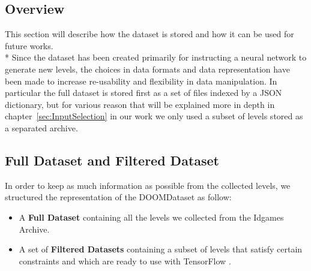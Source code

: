 \subsection{Overview}
This section will describe how the dataset is stored and how it can be used for future works. \\* 
Since the dataset has been created primarily for instructing a neural network to generate new levels, the choices in data formats and data representation have been made to increase re-usability and flexibility in data manipulation. In particular the full dataset is stored first as a set of files indexed by a JSON dictionary, but for various reason that will be explained more in depth in  chapter~\ref{sec:InputSelection} in our work we only used a subset of levels stored as a separated archive.
\subsection{Full Dataset and Filtered Dataset}
In order to keep as much information as possible from the collected levels, we structured the representation of the DOOMDataset as follow:
\begin{itemize}
	\item  A \textbf{Full Dataset} containing all the levels we collected from the Idgames Archive.
	\item A set of \textbf{Filtered Datasets} containing a subset of levels that satisfy certain constraints and which are ready to use with TensorFlow \cite{tensorflow2015-whitepaper}.
\end{itemize}

